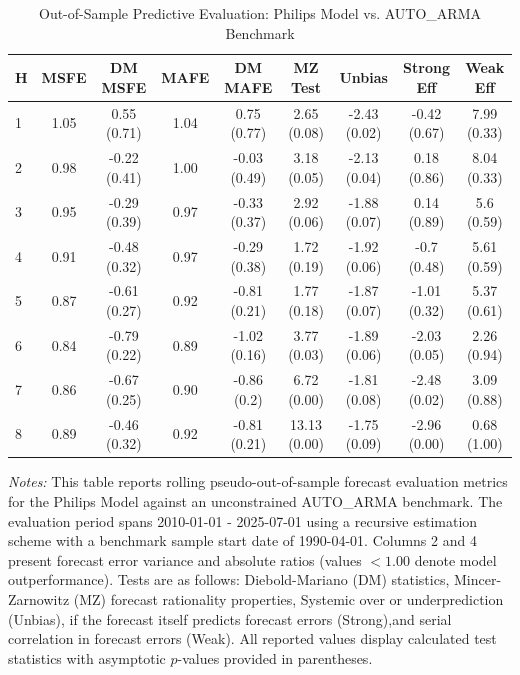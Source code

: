 \begin{table}[htbp]
\centering
\caption{Out-of-Sample Predictive Evaluation: Philips Model vs. AUTO_ARMA Benchmark}
\label{tab:philips_model_evaluation}
\footnotesize
\begin{tabular}{l cccccccc}
\hline\hline
\rule{0pt}{3ex}
\textbf{H} & \textbf{MSFE} & \textbf{DM MSFE} & \textbf{MAFE} & \textbf{DM MAFE} & \textbf{MZ Test} & \textbf{Unbias} & \textbf{Strong Eff} & \textbf{Weak Eff} \\[0.5ex]
\hline
\rule{0pt}{2.5ex}
1 & 1.05 & 0.55 (0.71) & 1.04 & 0.75 (0.77) & 2.65 (0.08) & -2.43 (0.02) & -0.42 (0.67) & 7.99 (0.33) \\
2 & 0.98 & -0.22 (0.41) & 1.00 & -0.03 (0.49) & 3.18 (0.05) & -2.13 (0.04) & 0.18 (0.86) & 8.04 (0.33) \\
3 & 0.95 & -0.29 (0.39) & 0.97 & -0.33 (0.37) & 2.92 (0.06) & -1.88 (0.07) & 0.14 (0.89) & 5.6 (0.59) \\
4 & 0.91 & -0.48 (0.32) & 0.97 & -0.29 (0.38) & 1.72 (0.19) & -1.92 (0.06) & -0.7 (0.48) & 5.61 (0.59) \\
5 & 0.87 & -0.61 (0.27) & 0.92 & -0.81 (0.21) & 1.77 (0.18) & -1.87 (0.07) & -1.01 (0.32) & 5.37 (0.61) \\
6 & 0.84 & -0.79 (0.22) & 0.89 & -1.02 (0.16) & 3.77 (0.03) & -1.89 (0.06) & -2.03 (0.05) & 2.26 (0.94) \\
7 & 0.86 & -0.67 (0.25) & 0.90 & -0.86 (0.2) & 6.72 (0.00) & -1.81 (0.08) & -2.48 (0.02) & 3.09 (0.88) \\
8 & 0.89 & -0.46 (0.32) & 0.92 & -0.81 (0.21) & 13.13 (0.00) & -1.75 (0.09) & -2.96 (0.00) & 0.68 (1.00) \\
\hline\hline
\end{tabular}%
\par\smallskip
\parbox{\textwidth}{\scriptsize \textit{Notes:} This table reports rolling pseudo-out-of-sample forecast evaluation metrics for the Philips Model against an unconstrained AUTO_ARMA benchmark. The evaluation period spans 2010-01-01 - 2025-07-01 using a recursive estimation scheme with a benchmark sample start date of 1990-04-01. Columns 2 and 4 present forecast error variance and absolute ratios (values $< 1.00$ denote model outperformance). Tests are as follows: Diebold-Mariano (DM) statistics, Mincer-Zarnowitz (MZ) forecast rationality properties, Systemic over or underprediction (Unbias), if the forecast itself predicts forecast errors (Strong),and serial correlation in forecast errors (Weak). All reported values display calculated test statistics with asymptotic $p$-values provided in parentheses.}
\end{table}
